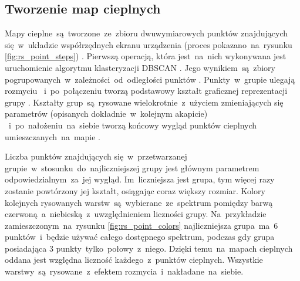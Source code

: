 \bigskip
{}

\subsection{Tworzenie map cieplnych}
Mapy cieplne~są~tworzone~ze~zbioru dwuwymiarowych punktów znajdujących się~w~układzie współrzędnych ekranu urządzenia (proces pokazano~na~rysunku \ref{fig:rs_point_steps}) . Pierwszą operacją, która jest~na~nich wykonywana jest uruchomienie algorytmu klasteryzacji DBSCAN \cite{DBSCAN_Wiki}. Jego wynikiem~są~zbiory pogrupowanych~w~zależności~od~odległości punktów . Punkty~w~grupie ulegają rozmyciu ~i~po~połączeniu tworzą podstawowy kształt graficznej reprezentacji grupy . Kształty grup~są~rysowane wielokrotnie~z~użyciem zmieniających się parametrów (opisanych dokładnie~w~kolejnym akapicie) ~i~po~nałożeniu~na~siebie tworzą końcowy wygląd punktów cieplnych umieszczanych~na~mapie .

\bigskip
{}

Liczba punktów znajdujących się~w~przetwarzanej grupie~w~stosunku~do~najliczniejszej grupy jest głównym parametrem odpowiedzialnym~za~jej wygląd. Im~liczniejsza jest grupa, tym więcej razy zostanie powtórzony jej kształt, osiągając coraz większy rozmiar. Kolory kolejnych rysowanych warstw~są~wybierane~ze~spektrum pomiędzy barwą czerwoną~a~niebieską~z~uwzględnieniem liczności grupy. Na~przykładzie zamieszczonym~na~rysunku \ref{fig:rs_point_colors} najliczniejsza grupa~ma~$6$ punktów~i~będzie używać całego dostępnego spektrum, podczas gdy grupa posiadająca $3$ punkty~tylko~połowy~z~niego. Dzięki temu~na~mapach cieplnych oddana jest względna liczność każdego~z~punktów cieplnych. Wszystkie warstwy~są~rysowane~z~efektem rozmycia~i~nakładane~na~siebie. 

\bigskip
{}
